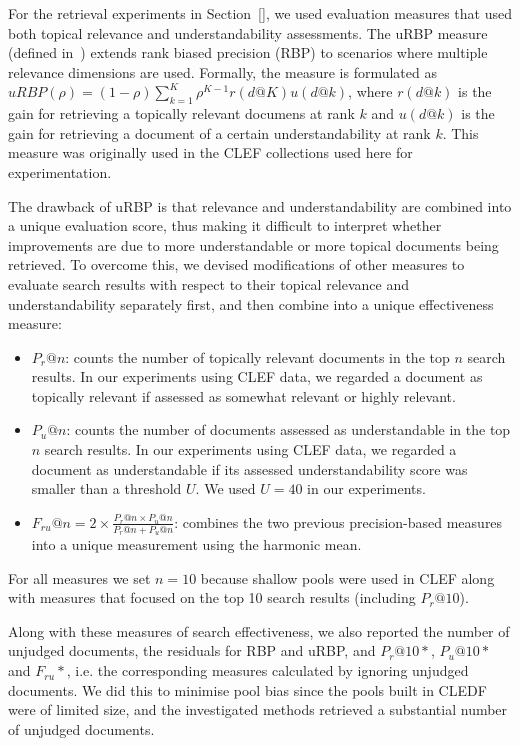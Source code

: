

For the retrieval experiments in Section~\ref{}, we used evaluation measures that used both topical relevance and understandability assessments. The uRBP measure (defined in~\cite{}) extends rank biased precision (RBP) to scenarios where multiple relevance dimensions are used. Formally, the measure is formulated as $uRBP(\rho) = (1 - \rho) \sum_{k=1}^{K} \rho^{K-1} r(d@K) u(d@k)$, where $r(d@k)$ is the gain for retrieving a topically relevant documens at rank $k$ and $u(d@k)$ is the gain for retrieving a document of a certain understandability at rank $k$. This measure was originally used in the CLEF collections used here for experimentation. 

The drawback of uRBP is that relevance and understandability are combined into a unique evaluation score, thus making it difficult to interpret whether improvements are due to more understandable or more topical documents being retrieved. To overcome this, we devised modifications of other measures to evaluate search results with respect to their topical relevance and understandability separately first, and then combine into a unique effectiveness measure:

\begin{itemize}
	\item $P_r@n$: counts the number of topically relevant documents in the top $n$  search results. In our experiments using CLEF data, we regarded a document as topically relevant if assessed as somewhat relevant or highly relevant.
	
	\item $P_u@n$: counts the number of documents assessed as understandable in the top $n$ search results. In our experiments using CLEF data, we regarded a document as understandable if its assessed understandability score was smaller than a threshold $U$. We used $U = 40$ in our experiments.
	
	\item $F_{ru}@n = 2 \times \frac{P_r@n \times P_u@n}{P_r@n + P_u@n}$: combines the two previous precision-based measures into a unique measurement using the harmonic mean.
\end{itemize}

\noindent For all measures we set $n=10$ because  shallow pools were used in CLEF along with measures that focused on the top 10 search results (including $P_r@10$).

Along with these measures of search effectiveness, we also reported the number of unjudged documents, the residuals for RBP and uRBP, and $P_r@10*$, $P_u@10*$ and $F_{ru}*$, i.e. the corresponding measures calculated by ignoring unjudged documents. We did this to minimise pool bias since the pools built in CLEDF were of limited size, and the investigated methods retrieved a substantial number of unjudged documents.


